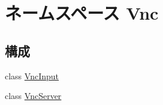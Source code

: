 \hypertarget{namespaceVnc}{
\section{ネームスペース Vnc}
\label{namespaceVnc}
}
\subsection*{構成}
\begin{DoxyCompactItemize}
\item 
class \hyperlink{classVnc_1_1VncInput}{VncInput}
\item 
class \hyperlink{classVnc_1_1VncServer}{VncServer}
\end{DoxyCompactItemize}
